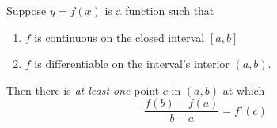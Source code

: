 \documentclass[12pt]{report}
\begin{document}
Suppose $y = f(x)$ is a function such that \\

\begin{enumerate}

\item $f$ is continuous on the closed interval $[a,b]$ \\

\item $f$ is differentiable on the interval's interior $(a,b)$.  \\

\end{enumerate}

Then there is \textit{at least one} point $c$ in $(a,b)$ at which \\

$$\frac{f(b) - f(a)}{b-a} = f'(c)$$
\end{document}
